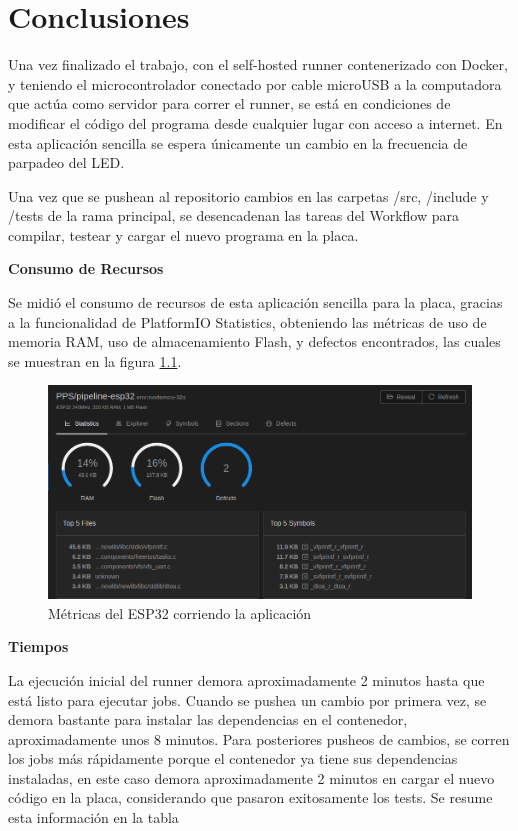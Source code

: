\chapter{Conclusiones}\label{cap:conclusiones}
Una vez finalizado el trabajo, con el self-hosted runner contenerizado con Docker, y teniendo el microcontrolador conectado por cable microUSB a la computadora que actúa como servidor para correr el runner, se está en condiciones de modificar el código del programa desde cualquier lugar con acceso a internet. En esta aplicación sencilla se espera únicamente un cambio en la frecuencia de parpadeo del LED.

Una vez que se pushean al repositorio cambios en las carpetas /src, /include y /tests de la rama principal, se desencadenan las tareas del Workflow para compilar, testear y cargar el nuevo programa en la placa.

\textbf{Consumo de Recursos}

Se midió el consumo de recursos de esta aplicación sencilla para la placa, gracias a la funcionalidad de PlatformIO Statistics, obteniendo las métricas de uso de memoria RAM, uso de almacenamiento Flash, y defectos encontrados, las cuales se muestran en la figura \ref{fig:metrics}.

\begin{figure}[H]
    \centering
    \includegraphics[width=1\textwidth]{fig/platformio-esp32-metrics.png}
    \caption{Métricas del ESP32 corriendo la aplicación}
    \label{fig:metrics}
\end{figure}

\textbf{Tiempos}

La ejecución inicial del runner demora aproximadamente 2 minutos hasta que está listo para ejecutar jobs.
Cuando se pushea un cambio por primera vez, se demora bastante para instalar las dependencias en el contenedor, aproximadamente unos 8 minutos. Para posteriores pusheos de cambios, se corren los jobs más rápidamente porque el contenedor ya tiene sus dependencias instaladas, en este caso demora aproximadamente 2 minutos en cargar el nuevo código en la placa, considerando que pasaron exitosamente los tests. Se resume esta información en la tabla

